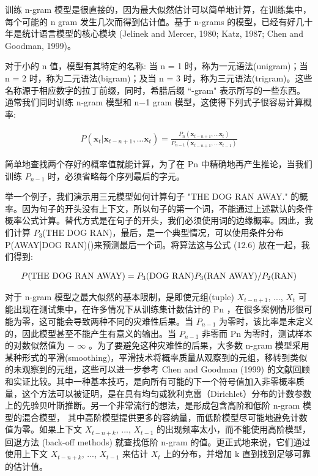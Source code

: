 训练 n-gram 模型是很直接的，因为最大似然估计可以简单地计算，在训练集中，每个可能的 n gram 发生几次而得到估计值。基于 n-grams 的模型，已经有好几十年是统计语言模型的核心模块 (Jelinek and Mercer, 1980; Katz, 1987; Chen and Goodman, 1999)。


对于小的 n 值，模型有其特定的名称: 当 n = 1 时，称为一元语法(unigram)；当 n = 2 时，称为二元语法(bigram)；及当 n = 3 时，称为三元语法(trigram)。这些名称源于相应数字的拉丁前缀，同时，希腊后缀 “-gram" 表示所写的一些东西。通常我们同时训练 n-gram 模型和 n−1 gram 模型，这使得下列式子很容易计算概率:


\begin{align}
\label{eq:necessary}
P(\bm{x}_{t} | \bm{x}_{t-n+1},...\bm{x}_{t}) 
= \frac{P_n(\bm{x}_{t-n+1},...\bm{x}_{t}) }{P_{n-1}(\bm{x}_{t-n+1},...\bm{x}_{t-1}) }
\end{align}


简单地查找两个存好的概率值就能计算，为了在 Pn 中精确地再产生推论，当我们训练 \({P_{n-1}}\) 时，必须省略每个序列最后的字元。

举一个例子，我们演示用三元模型如何计算句子 "THE DOG RAN AWAY." 的概率。因为句子的开头没有上下文，所以句子的第一个词，不能通过上述默认的条件概率公式计算。替代方式是在句子的开头，我们必须使用词的边缘概率。因此，我们计算 \({P_{3}}\)(THE DOG RAN)，最后，是一个典型情况，可以使用条件分布 P(AWAY|DOG RAN)()来预测最后一个词。将算法这与公式 (12.6) 放在一起，我们得到:

\begin{align}
\label{eq:necessary}
P(\textrm{THE DOG RAN AWAY}) = {P_{3}}(\textrm{DOG RAN}){P_{3}}(\textmd{RAN AWAY})/{P_{2}}(\textmd{RAN})
\end{align}


对于 n-gram 模型之最大似然的基本限制，是即使元组(tuple) \({X_{t-n+1}}\), ..., \({X_{t}}\) 可能出现在测试集中，在许多情况下从训练集计数估计的 Pn ，在很多案例情形很可能为零，这可能会导致两种不同的灾难性后果。当 \({P_{n-1}}\) 为零时，该比率是未定义的，因此模型甚至不能产生有意义的输出。当 \({P_{n-1}}\) 非零而 Pn 为零时，测试样本的对数似然值为 − \(\infty\) 。为了要避免这种灾难性的后果，大多数 n-gram 模型采用某种形式的平滑(smoothing)，平滑技术将概率质量从观察到的元组，移转到类似的未观察到的元组，这些可以进一步参考 Chen and Goodman (1999) 的文献回顾和实证比较。其中一种基本技巧，是向所有可能的下一个符号值加入非零概率质量，这个方法可以被证明，是在具有均匀或狄利克雷（Dirichlet）分布的计数参数上的先验贝叶斯推断。另一个非常流行的想法，是形成包含高阶和低阶 n-gram 模型的混合模型， 其中高阶模型提供更多的容纳量，而低阶模型尽可能地避免计数值为零。如果上下文 \({X_{t-n+k}}\), ..., \({X_{t-1}}\) 的出现频率太小，而不能使用高阶模型，回退方法 (back-off methods) 就查找低阶 n-gram 的值。更正式地来说，它们通过使用上下文 \({X_{t-n+k}}\), ..., \({X_{t-1}}\) 来估计  \({X_{t}}\) 上的分布，并增加 k 直到找到足够可靠的估计值。


